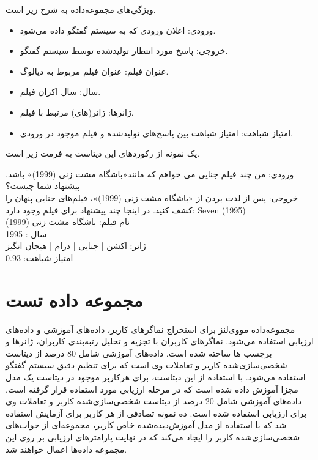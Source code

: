 ویژگی‌های مجموعه‌داده به شرح زیر است.
\begin{itemize}
\item
ورودی: اعلان ورودی که به سیستم گفتگو داده می‌شود.
\item
 خروجی: پاسخ مورد انتظار تولید‌شده توسط سیستم گفتگو.
\item
 عنوان فیلم: عنوان فیلم مربوط به دیالوگ.
\item
 سال: سال اکران فیلم.
\item
 ژانرها: ژانر(های) مرتبط با فیلم.
\item
امتیاز شباهت: امتیاز شباهت بین پاسخ‌های تولید‌شده و فیلم موجود در ورودی.
\end{itemize}	

یک نمونه از رکوردهای این دیتاست به فرمت زیر است.

 ورودی: من چند فیلم جنایی می خواهم که مانند«باشگاه مشت زنی (1999)» باشد. پیشنهاد شما چیست؟\\
 خروجی: پس از لذت بردن از «باشگاه مشت زنی (1999)»، فیلم‌های جنایی پنهان را کشف کنید. در اینجا چند پیشنهاد برای فیلم وجود دارد: Seven (1995)\\
 نام فیلم: باشگاه مشت زنی (1999)\\
 سال : 1995\\
 ژانر: اکشن | جنایی | درام | هیجان انگیز\\
 امتیاز شباهت: 
\num{0.93}\\


\section{مجموعه داده تست}
مجموعه‌داده مووی‌لنز برای استخراج نماگر‌های کاربر، داده‌های آموزشی و داده‌های ارزیابی استفاده می‌شود.
نماگر‌های کاربران با تجزیه و تحلیل رتبه‌بندی کاربران، ژانرها و برچسب ها ساخته شده است.
\newline
داده‌های آموزشی شامل 80 درصد از دیتاست شخصی‌سازی‌شده کاربر و تعاملات وی است که برای تنظیم دقیق سیستم گفتگو استفاده می‌شود. با استفاده از این دیتاست، برای هرکاربر موجود در دیتاست یک مدل مجزا آموزش داده شده است که در مرحله ارزیابی مورد استفاده قرار گرفته‌ است.
\newline
داده‌های آموزشی شامل 20 درصد از دیتاست شخصی‌سازی‌شده کاربر و تعاملات وی برای ارزیابی استفاده شده است. ده نمونه تصادفی از هر کاربر برای آزمایش استفاده شد که با استفاده از مدل آموزش‌دیده‌شده خاص کاربر، مجموعه‌ای از جواب‌های شخصی‌سازی‌شده کاربر را ایجاد می‌کند که در نهایت پارامترهای ارزیابی بر روی این مجموعه داده‌ها اعمال خواهند شد.



